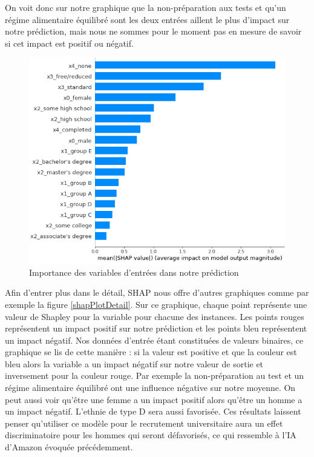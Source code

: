 On voit donc sur notre graphique que la non-préparation aux tests et qu'un régime alimentaire équilibré sont les deux entrées aillent le plus d'impact sur notre prédiction, mais nous ne sommes pour le moment pas en mesure de savoir si cet impact est positif ou négatif.

\begin{figure}[h]
    \includegraphics[scale=0.6]{src_img/shapPlotBar.png}
    \caption{Importance des variables d'entrées dans notre prédiction}
    \label{shapPlotBar}
\end{figure}
Afin d'entrer plus dans le détail, SHAP nous offre d'autres graphiques comme par exemple la figure \ref{shapPlotDetail}. Sur ce graphique, chaque point représente une valeur de Shapley pour la variable pour chacune des instances. Les points rouges représentent un impact positif sur notre prédiction et les points bleu représentent un impact négatif. Nos données d'entrée étant constituées de valeurs binaires, ce graphique se lis de cette manière : si la valeur est positive et que la couleur est bleu alors la variable a un impact négatif sur notre valeur de sortie et inversement pour la couleur rouge. Par exemple la non-préparation au test et un régime alimentaire équilibré ont une influence négative sur notre moyenne. On peut aussi voir qu'être une femme a un impact positif alors qu'être un homme a un impact négatif. L’ethnie de type D sera aussi favorisée. Ces résultats laissent penser qu'utiliser ce modèle pour le recrutement universitaire aura un effet discriminatoire pour les hommes qui seront défavorisés, ce qui ressemble à l’IA d’Amazon évoquée précédemment.
